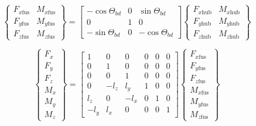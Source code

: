     \begin{equation}
    \left\{\begin{array}{ll}
    F_{x\mathrm{fus}} & M_{x\mathrm{fus}} \\
    F_{y\mathrm{fus}} & M_{y\mathrm{fus}} \\
    F_{z\mathrm{fus}} & M_{z\mathrm{fus}}
    \end{array}\right\}=\left[\begin{array}{ccc}
    -\cos \Theta_{b d} & 0 & \sin \Theta_{b d} \\
    0 & 1 & 0 \\
    -\sin \Theta_{b d} & 0 & -\cos \Theta_{b d}
    \end{array}\right]\left\{\begin{array}{cc}
    F_{x\mathrm{hub}} & M_{x\mathrm{hub}} \\
    F_{y\mathrm{hub}} & M_{y\mathrm{hub}} \\
    F_{z\mathrm{hub}} & M_{z\mathrm{hub}}     \label{eq:FMfus}
    \end{array}\right\}
    \end{equation}

    \begin{equation}
    \left\{\begin{array}{c}
    F_x \\
    F_y \\
    F_z \\
    M_x \\
    M_y \\
    M_z
    \end{array}\right\}=\left[\begin{array}{cccccc}
    1 & 0 & 0 & 0 & 0 & 0 \\
    0 & 1 & 0 & 0 & 0 & 0 \\
    0 & 0 & 1 & 0 & 0 & 0 \\
    0 & -l_z & l_y & 1 & 0 & 0 \\
    l_z & 0 & -l_x & 0 & 1 & 0 \\
    -l_y & l_x & 0 & 0 & 0 & 1
    \end{array}\right]\left\{\begin{array}{c}
    F_{x\mathrm{fus}} \\
    F_{y\mathrm{fus}} \\
    F_{z\mathrm{fus}} \\
    M_{x\mathrm{fus}} \\
    M_{y\mathrm{fus}} \\
    M_{z\mathrm{fus}}            \label{eq:convert_fus}
    \end{array}\right\}
    \end{equation}

